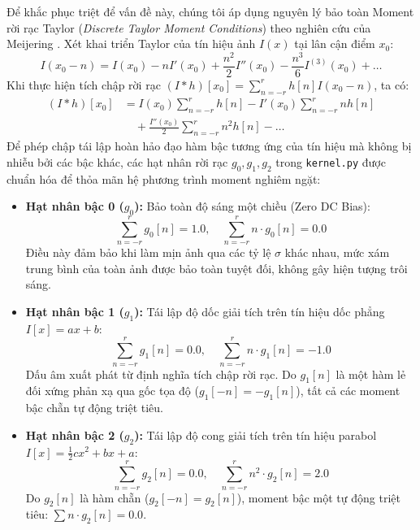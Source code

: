 \documentclass[conference]{IEEEtran}
\begin{document}
Để khắc phục triệt để vấn đề này, chúng tôi áp dụng nguyên lý bảo toàn Moment rời rạc Taylor (\textit{Discrete Taylor Moment Conditions}) theo nghiên cứu của Meijering \cite{meijering2004design}. Xét khai triển Taylor của tín hiệu ảnh $I(x)$ tại lân cận điểm $x_0$:
\begin{equation}
I(x_0 - n) = I(x_0) - n I'(x_0) + \frac{n^2}{2} I''(x_0) - \frac{n^3}{6} I^{(3)}(x_0) + \dots
\end{equation}
Khi thực hiện tích chập rời rạc $(I * h)[x_0] = \sum_{n=-r}^r h[n] I(x_0 - n)$, ta có:
\begin{align}
(I * h)[x_0] &= I(x_0) \sum_{n=-r}^r h[n] - I'(x_0) \sum_{n=-r}^r n h[n] \nonumber \\
&\quad + \frac{I''(x_0)}{2} \sum_{n=-r}^r n^2 h[n] - \dots
\end{align}
Để phép chập tái lập hoàn hảo đạo hàm bậc tương ứng của tín hiệu mà không bị nhiễu bởi các bậc khác, các hạt nhân rời rạc $g_0, g_1, g_2$ trong \texttt{kernel.py} được chuẩn hóa để thỏa mãn hệ phương trình moment nghiêm ngặt:
\begin{itemize}
    \item \textbf{Hạt nhân bậc 0 ($g_0$):} Bảo toàn độ sáng một chiều (Zero DC Bias):
    \begin{equation}
    \sum_{n=-r}^r g_0[n] = 1.0, \quad \sum_{n=-r}^r n \cdot g_0[n] = 0.0
    \end{equation}
    Điều này đảm bảo khi làm mịn ảnh qua các tỷ lệ $\sigma$ khác nhau, mức xám trung bình của toàn ảnh được bảo toàn tuyệt đối, không gây hiện tượng trôi sáng.
    \item \textbf{Hạt nhân bậc 1 ($g_1$):} Tái lập độ dốc giải tích trên tín hiệu dốc phẳng $I[x] = ax + b$:
    \begin{equation}
    \sum_{n=-r}^r g_1[n] = 0.0, \quad \sum_{n=-r}^r n \cdot g_1[n] = -1.0
    \end{equation}
    Dấu âm xuất phát từ định nghĩa tích chập rời rạc. Do $g_1[n]$ là một hàm lẻ đối xứng phản xạ qua gốc tọa độ ($g_1[-n] = -g_1[n]$), tất cả các moment bậc chẵn tự động triệt tiêu.
    \item \textbf{Hạt nhân bậc 2 ($g_2$):} Tái lập độ cong giải tích trên tín hiệu parabol $I[x] = \frac{1}{2} c x^2 + bx + a$:
    \begin{equation}
    \sum_{n=-r}^r g_2[n] = 0.0, \quad \sum_{n=-r}^r n^2 \cdot g_2[n] = 2.0
    \end{equation}
    Do $g_2[n]$ là hàm chẵn ($g_2[-n] = g_2[n]$), moment bậc một tự động triệt tiêu: $\sum n \cdot g_2[n] = 0.0$.
\end{itemize}
\end{document}
